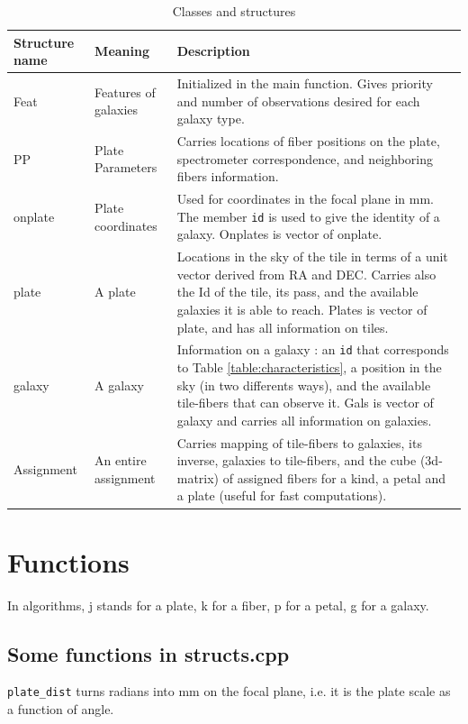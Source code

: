 \documentclass{extarticle}
\begin{document}
\begin{table}[H]\begin{center}
	\begin{tabular}{|l|l|p{12cm}|} \hline
		Structure name & Meaning & Description \\ \hline \hline

		Feat & Features of galaxies & Initialized in the main function. Gives priority and number of observations desired for each galaxy type.\\ \hline

		PP & Plate Parameters & Carries locations of fiber positions on the plate, spectrometer correspondence, and neighboring fibers information.\\ 

		onplate & Plate coordinates & Used for coordinates in the focal plane in mm. The member {\tt id} is used to give the identity of a galaxy. Onplates is vector of onplate.\\ 

		plate & A plate & Locations in the sky of the tile in terms of a unit vector derived from RA and DEC. Carries also the Id of the tile, its pass, and the available galaxies it is able to reach. Plates is vector of plate, and has all information on tiles.\\ \hline

		galaxy & A galaxy & Information on a galaxy : an {\tt id} that corresponds to Table \ref{table:characteristics}, a position in the sky (in two differents ways), and the available tile-fibers that can observe it. Gals is vector of galaxy and carries all information on galaxies.\\ \hline

		Assignment & An entire assignment & Carries mapping of tile-fibers to galaxies, its inverse, galaxies to tile-fibers, and the cube (3d-matrix) of assigned fibers for a kind, a petal and a plate (useful for fast computations).\\ \hline
	\end{tabular}\end{center}
	\caption{Classes and structures}\label{tab:structures}
\end{table}


\section{Functions}
In algorithms, j stands for a plate, k for a fiber, p for a petal, g for a galaxy.

\subsection{Some functions in structs.cpp}
{\tt plate\_dist} turns radians into mm on the focal plane, i.e. it is the plate scale as a function of angle.
\end{document}
